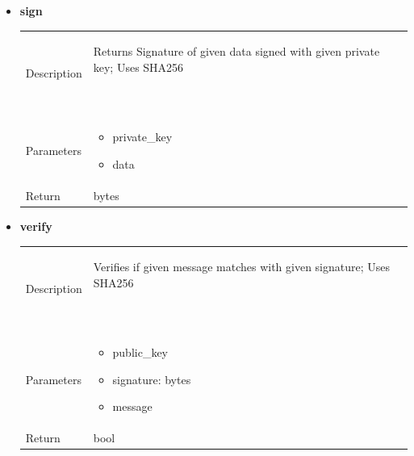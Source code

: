 \documentclass[11pt]{article}
\begin{document}
\begin{itemize}
\item
  \textbf{sign}
  \begin{longtable}[]{@{}ll@{}}
  \toprule
  \endhead
   \begin{minipage}[t]{0.40\columnwidth}\raggedright
  Description\strut
  \end{minipage} & \begin{minipage}[t]{0.54\columnwidth}\raggedright
    Returns Signature of given data signed with given private key; Uses SHA256
\strut
  \end{minipage}\ 
  \tabularnewline
  \begin{minipage}[t]{0.40\columnwidth}\raggedright
  Parameters\strut
  \end{minipage} & \begin{minipage}[t]{0.54\columnwidth}\raggedright
  \begin{itemize}
  	\item private\_key
  	\item data
  \end{itemize} \strut
  \end{minipage}\tabularnewline
  \begin{minipage}[t]{0.40\columnwidth}\raggedright
  Return \strut
  \end{minipage} & \begin{minipage}[t]{0.54\columnwidth}\raggedright
	bytes \strut
  \end{minipage}\tabularnewline
  \bottomrule
  \end{longtable}
  
\item
  \textbf{verify}


  \begin{longtable}[]{@{}ll@{}}
  \toprule
  \endhead
   \begin{minipage}[t]{0.40\columnwidth}\raggedright
  Description\strut
  \end{minipage} & \begin{minipage}[t]{0.54\columnwidth}\raggedright
    Verifies if given message matches with given signature; Uses SHA256
  \strut
  \end{minipage}\ 
  \tabularnewline
  \begin{minipage}[t]{0.40\columnwidth}\raggedright
  Parameters\strut
  \end{minipage} & \begin{minipage}[t]{0.54\columnwidth}\raggedright
  \begin{itemize}
  	\item public\_key
  	\item signature: bytes
  	\item message
  \end{itemize} \strut
  \end{minipage}\tabularnewline
  \begin{minipage}[t]{0.40\columnwidth}\raggedright
  Return \strut
  \end{minipage} & \begin{minipage}[t]{0.54\columnwidth}\raggedright
	bool \strut
  \end{minipage}\tabularnewline
  \bottomrule
  \end{longtable}
  


  

\end{itemize}
\end{document}
